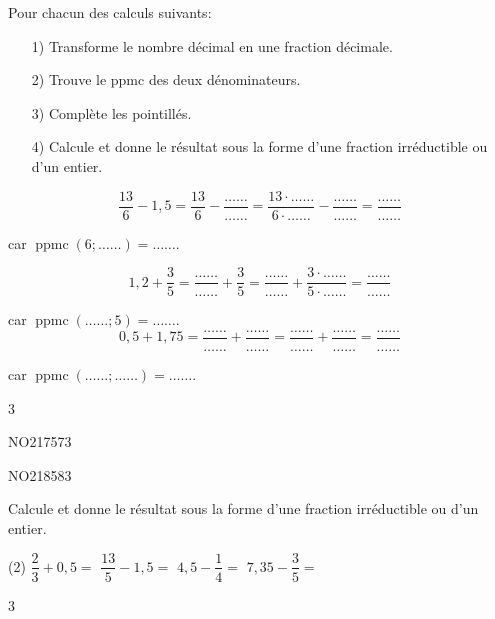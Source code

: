 \documentclass[a4paper,11pt]{report}
\begin{document}
\begin{exop}
{Pour chacun des calculs suivants:
	\begin{enumerate}
    \item[1)] Transforme le nombre décimal en une fraction décimale.
    \item[2)] Trouve le ppmc des deux dénominateurs.
    \item[3)] Complète les pointillés.
    \item[4)] Calcule et donne le résultat sous la forme d'une fraction irréductible ou d'un entier.
\end{enumerate}
\vspace{1pt}

\begin{tasks}
	\task \[\dfrac{13}{6}-1,5=\dfrac{13}{6}-\dfrac{\ldots\ldots}{\ldots\ldots}=\dfrac{13\cdot \ldots\ldots}{6\cdot \ldots\ldots}-\dfrac{\ldots\ldots}{\ldots\ldots}=\dfrac{\ldots\ldots}{\ldots\ldots}\]
\vspace{1pt}

		car $\operatorname{ppmc}(6;\ldots\ldots)=\ldots\ldots$.

	\task \[1,2+\dfrac{3}{5}=\dfrac{\ldots\ldots}{\ldots\ldots}+\dfrac{3}{5}=\dfrac{\ldots\ldots}{\ldots\ldots}+\dfrac{3\cdot \ldots\ldots}{5\cdot \ldots\ldots}=\dfrac{\ldots\ldots}{\ldots\ldots}\]
\vspace{1pt}

		car $\operatorname{ppmc}(\ldots\ldots;5)=\ldots\ldots$.
	\task \[0,5+1,75=\dfrac{\ldots\ldots}{\ldots\ldots}+\dfrac{\ldots\ldots}{\ldots\ldots}=\dfrac{\ldots\ldots}{\ldots\ldots}+\dfrac{\ldots\ldots}{\ldots\ldots}=\dfrac{\ldots\ldots}{\ldots\ldots}\]
\vspace{1pt}

		car $\operatorname{ppmc}(\ldots\ldots;\ldots\ldots)=\ldots\ldots$.
\end{tasks}}
{3}
\end{exop}


\begin{exol}{NO217}{57}{3}
\end{exol}
\begin{exol}{NO218}{58}{3}
\end{exol}

\begin{exo}
 {Calcule et donne le résultat sous la forme d'une fraction irréductible ou d'un entier.
	 \begin{tasks}(2)
\task $\dfrac{2}{3}+0,5=$
\task $\dfrac{13}{5}-1,5=$
\task $4,5-\dfrac{1}{4}=$
\task $7,35-\dfrac{3}{5}=$
\end{tasks}}
{3}
\end{exo}
\end{document}
